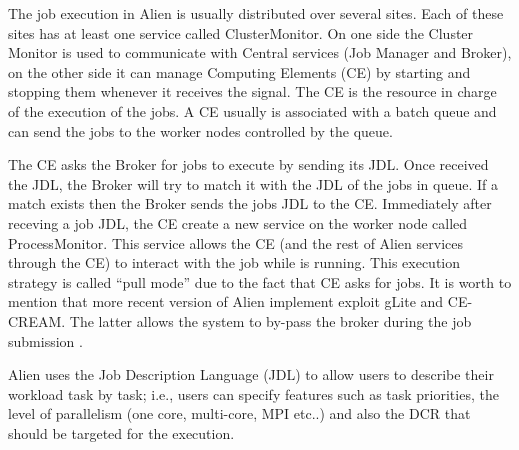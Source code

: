 The job execution in Alien is usually distributed over several sites. Each of these sites has at least one service called ClusterMonitor. On one side the Cluster Monitor is used to communicate with Central services (Job Manager and Broker), on the other side it can manage Computing Elements (CE) by starting and stopping them whenever it receives the signal.
The CE is the resource in charge of the execution of the jobs. A CE usually is associated with a batch queue and can send the jobs to the worker nodes controlled by the queue.

The CE asks the Broker for jobs to execute by sending its JDL. Once received the JDL, the Broker will try to match it with the JDL of the jobs in queue. If a match exists then the Broker sends the jobs JDL to the CE.
Immediately after receving a job JDL, the CE create a new service on the worker node called ProcessMonitor. This service allows the CE (and the rest of Alien services through the CE) to interact with the job while is running. 
This execution strategy is called ``pull mode'' due to the fact that CE asks for jobs.
It is worth to mention that more recent version of Alien implement exploit gLite and CE-CREAM. The latter allows the system to by-pass the broker during the job submission \cite{}. 

Alien uses the Job Description Language (JDL) to allow users to describe their workload task by task;  i.e.,  users can specify features such as task priorities, the level of parallelism (one core, multi-core, MPI etc..) and  also the DCR that should be targeted for the execution.


